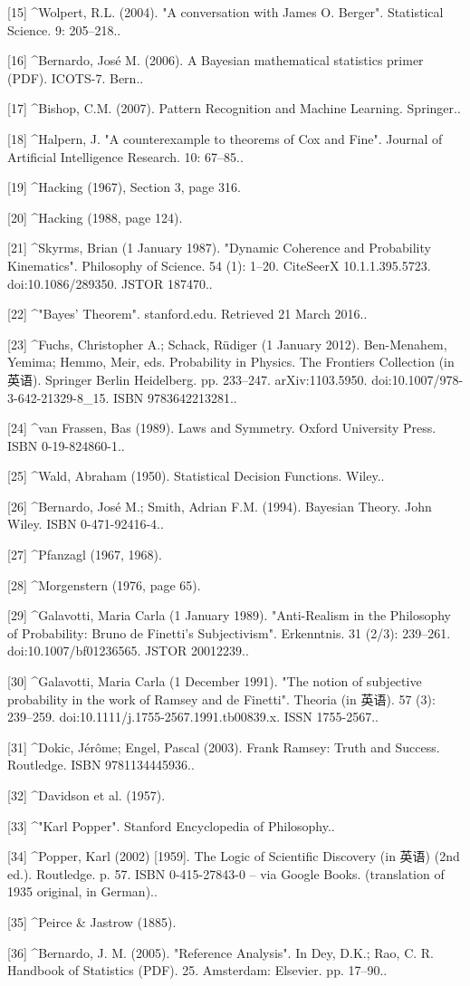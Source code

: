 [15]
^Wolpert, R.L. (2004). "A conversation with James O. Berger". Statistical Science. 9: 205–218..

[16]
^Bernardo, José M. (2006). A Bayesian mathematical statistics primer (PDF). ICOTS-7. Bern..

[17]
^Bishop, C.M. (2007). Pattern Recognition and Machine Learning. Springer..

[18]
^Halpern, J. "A counterexample to theorems of Cox and Fine". Journal of Artificial Intelligence Research. 10: 67–85..

[19]
^Hacking (1967), Section 3, page 316.

[20]
^Hacking (1988, page 124).

[21]
^Skyrms, Brian (1 January 1987). "Dynamic Coherence and Probability Kinematics". Philosophy of Science. 54 (1): 1–20. CiteSeerX 10.1.1.395.5723. doi:10.1086/289350. JSTOR 187470..

[22]
^"Bayes' Theorem". stanford.edu. Retrieved 21 March 2016..

[23]
^Fuchs, Christopher A.; Schack, Rüdiger (1 January 2012). Ben-Menahem, Yemima; Hemmo, Meir, eds. Probability in Physics. The Frontiers Collection (in 英语). Springer Berlin Heidelberg. pp. 233–247. arXiv:1103.5950. doi:10.1007/978-3-642-21329-8_15. ISBN 9783642213281..

[24]
^van Frassen, Bas (1989). Laws and Symmetry. Oxford University Press. ISBN 0-19-824860-1..

[25]
^Wald, Abraham (1950). Statistical Decision Functions. Wiley..

[26]
^Bernardo, José M.; Smith, Adrian F.M. (1994). Bayesian Theory. John Wiley. ISBN 0-471-92416-4..

[27]
^Pfanzagl (1967, 1968).

[28]
^Morgenstern (1976, page 65).

[29]
^Galavotti, Maria Carla (1 January 1989). "Anti-Realism in the Philosophy of Probability: Bruno de Finetti's Subjectivism". Erkenntnis. 31 (2/3): 239–261. doi:10.1007/bf01236565. JSTOR 20012239..

[30]
^Galavotti, Maria Carla (1 December 1991). "The notion of subjective probability in the work of Ramsey and de Finetti". Theoria (in 英语). 57 (3): 239–259. doi:10.1111/j.1755-2567.1991.tb00839.x. ISSN 1755-2567..

[31]
^Dokic, Jérôme; Engel, Pascal (2003). Frank Ramsey: Truth and Success. Routledge. ISBN 9781134445936..

[32]
^Davidson et al. (1957).

[33]
^"Karl Popper". Stanford Encyclopedia of Philosophy..

[34]
^Popper, Karl (2002) [1959]. The Logic of Scientific Discovery (in 英语) (2nd ed.). Routledge. p. 57. ISBN 0-415-27843-0 – via Google Books. (translation of 1935 original, in German)..

[35]
^Peirce & Jastrow (1885).

[36]
^Bernardo, J. M. (2005). "Reference Analysis". In Dey, D.K.; Rao, C. R. Handbook of Statistics (PDF). 25. Amsterdam: Elsevier. pp. 17–90..